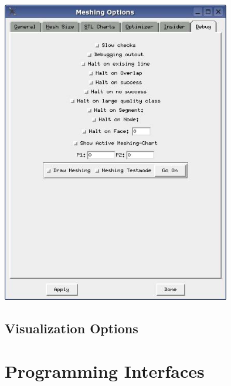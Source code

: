 \documentclass[12pt]{book}
\begin{document}
\includegraphics[width=10cm]{pictures/meshingoptions_6} 


\section{Visualization Options}



%


\chapter{Programming Interfaces}
%
\end{document}

